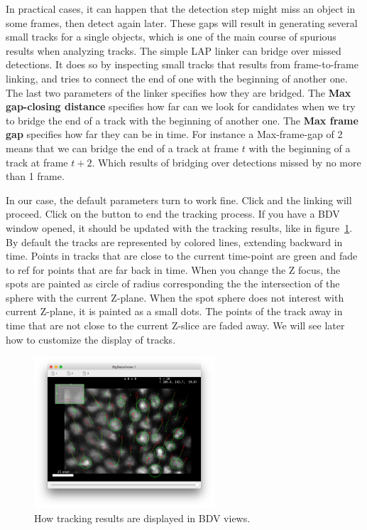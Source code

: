 In practical cases, it can happen that the detection step might miss an object in some frames, then detect again later.
These gaps will result in generating several small tracks for a single objects, which is one of the main course of spurious results when analyzing tracks. 
The simple LAP linker can bridge over missed detections.
It does so by inspecting small tracks that results from frame-to-frame linking, and tries to connect the end of one with the beginning of another one.
The last two parameters of the linker specifies how they are bridged. 
The \textbf{Max gap-closing distance} specifies how far can we look for candidates when we try to bridge the end of a track with the beginning of another one.
The \textbf{Max frame gap} specifies how far they can be in time. 
For instance a Max-frame-gap of 2 means that we can bridge the end of a track at frame $t$ with the beginning of a track at frame $t+2$.
Which results of bridging over detections missed by no more than 1 frame.

In our case, the default parameters turn to work fine. 
Click  and the linking will proceed. 
Click on the  button to end the tracking process.
If you have a BDV window opened, it should be updated with the tracking results, like in figure~\ref{fig:Tracking results}.
By default the tracks are represented by colored lines, extending backward in time.
Points in tracks that are close to the current time-point are green and fade to ref for points that are far back in time.
When you change the Z focus, the spots are painted as circle of radius corresponding the the intersection of the sphere with the current Z-plane. 
When the spot sphere does not interest with current Z-plane, it is painted as a small dots.
The points of the track away in time that are not close to the current Z-slice are faded away.
We will see later how to customize the display of tracks. 
 
 
\begin{figure}
    \centering
    \includegraphics[width=0.6\textwidth,trim=0.5cm .5cm .5cm .5cm,clip]{figures/Mastodon_LinkingResults.png}
     \caption{How tracking results are displayed in BDV views.}
     \label{fig:Tracking results}
\end{figure}  
 

